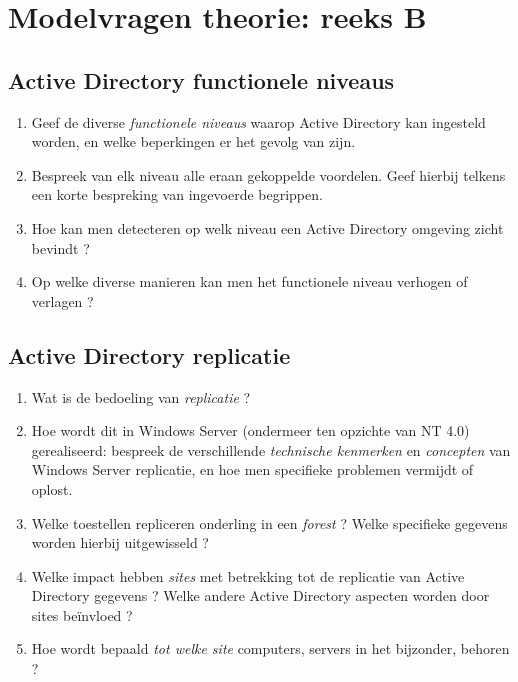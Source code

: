 \documentclass{report}
\begin{document}
	\chapter{Modelvragen theorie: reeks B}
	\section{Active Directory functionele niveaus }
	\begin{enumerate}
		\item Geef de diverse \textit{functionele niveaus} waarop Active Directory kan ingesteld worden, en welke beperkingen er het gevolg van zijn.
		\item Bespreek van elk niveau alle eraan gekoppelde voordelen. Geef hierbij telkens een korte bespreking  van ingevoerde begrippen.
		
		\item Hoe kan men detecteren op welk niveau een Active Directory omgeving zicht bevindt ?
		
		\item Op welke diverse manieren kan men het functionele niveau verhogen of verlagen ?
	\end{enumerate}
	
	\section{Active Directory replicatie }
	\begin{enumerate}
		\item Wat is de bedoeling van \textit{replicatie} ?
		
		\item Hoe wordt dit in Windows Server (ondermeer ten opzichte van NT 4.0) gerealiseerd: bespreek de verschillende \textit{technische kenmerken} en \textit{concepten} van Windows Server replicatie, en hoe men specifieke problemen vermijdt of oplost.
		
		\item Welke toestellen repliceren onderling in een \textit{forest} ? Welke specifieke gegevens worden hierbij uitgewisseld ?
		
		\item Welke impact hebben \textit{sites} met betrekking tot de replicatie van Active Directory gegevens ? Welke andere Active Directory aspecten worden door sites beïnvloed ? 
		
		\item Hoe wordt bepaald \textit{tot welke site} computers, servers in het bijzonder, behoren ? 
	\end{enumerate}
\end{document}
